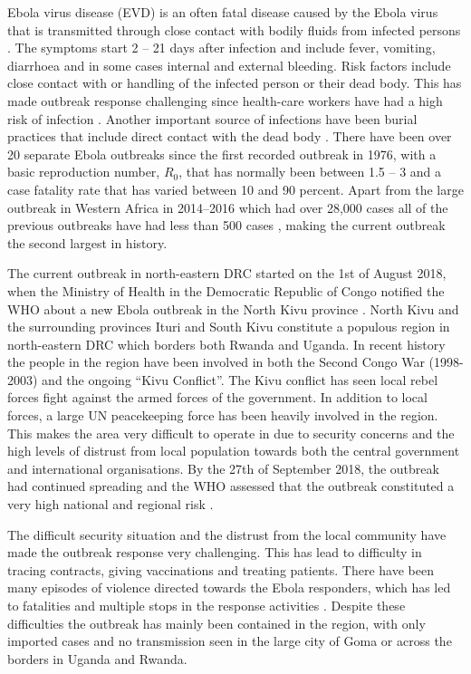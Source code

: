 \documentclass[12pt]{article}
\begin{document}
Ebola virus disease (EVD) is an often fatal disease caused by the Ebola virus that is transmitted through close contact with bodily fluids from infected persons \cite{worldhealthorganisationEbolaVirusDisease}. The symptoms start 2 -- 21 days after infection and include fever, vomiting, diarrhoea and in some cases internal and external bleeding.  Risk factors include close contact with or handling of the infected person or their dead body. This has made outbreak response challenging since health-care workers have had a high risk of infection \cite{brainardRiskFactorsTransmission2016}. Another important source of infections have been burial practices that include direct contact with the dead body \cite{brainardRiskFactorsTransmission2016}. There have been over 20 separate Ebola outbreaks since the first recorded outbreak in 1976, with a basic reproduction number, $R_0$, that has normally been between 1.5 -- 3 \cite{whoebolaresponseteamEbolaVirusDisease2014,legrandUnderstandingDynamicsEbola2007} and a case fatality rate that has varied between 10 and 90 percent. Apart from the large outbreak in Western Africa in 2014--2016 which had over 28,000 cases all of the previous outbreaks have had less than 500 cases \cite{worldhealthorganisationEbolaVirusDisease}, making the current outbreak the second largest in history.

The current outbreak in north-eastern DRC started on the 1st of August 2018, when the Ministry of Health in the Democratic Republic of Congo notified the WHO about a new Ebola outbreak in the North Kivu province \cite{worldhealthorganizationEbolaOutbreakDRC2018a}. North Kivu and the surrounding provinces Ituri and South Kivu constitute a populous region in north-eastern DRC which borders both Rwanda and Uganda. In recent history the people in the region have been involved in both the Second Congo War (1998-2003) and the ongoing ``Kivu Conflict''. The Kivu conflict has seen local rebel forces fight against the armed forces of the government. In addition to local forces, a large UN peacekeeping force has been heavily involved in the region. This makes the area very difficult to operate in due to security concerns and the high levels of distrust from local population towards both the central government and international organisations. By the 27th of September 2018, the outbreak had continued spreading and the WHO assessed that the outbreak constituted a very high national and regional risk \cite{worldhealthorganizationEbolaOutbreakDRC2018b}.

The difficult security situation and the distrust from the local community have made the outbreak response very challenging. This has lead to difficulty in tracing contracts, giving vaccinations and treating patients. There have been many episodes of violence directed towards the Ebola responders, which has led to fatalities and multiple stops in the response activities \cite{worldhealthorganizationEbolaOutbreakDRC2018c,worldhealthorganizationEbolaOutbreakDRC2019a}. Despite these difficulties the outbreak has mainly been contained in the region, with only imported cases and no transmission seen in the large city of Goma or across the borders in Uganda and Rwanda. 
\end{document}

